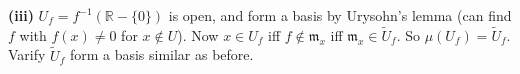 \textbf{(iii)} $U_f=f^{-1}(\mathbb R-\{0\})$ is open, and form a basis by Urysohn's lemma (can find $f$ with $f(x)\neq0$ for $x\notin U$). Now $x\in U_f$ iff $f\notin\mathfrak m_x$ iff $\mathfrak m_x\in\widetilde U_f$. So $\mu(U_f)=\widetilde U_f$. Varify $\widetilde U_f$ form a basis similar as before.
